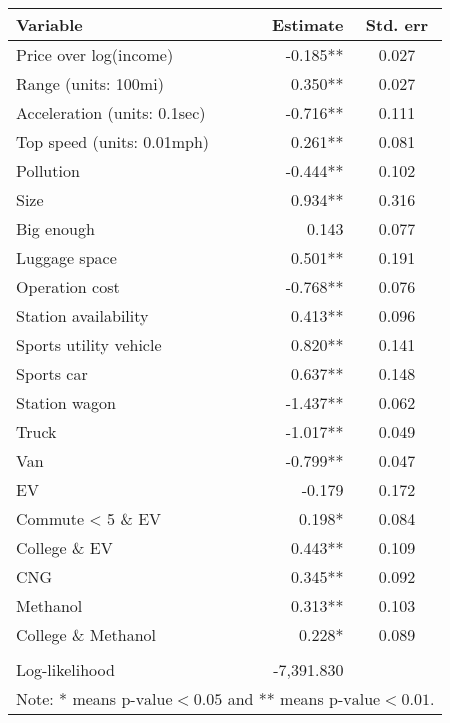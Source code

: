 \begin{tabular}{lrc}
\toprule
{Variable} &  Estimate &  Std. err \\
\midrule
Price over log(income)       &      -0.185** &    0.027 \\
Range (units: 100mi)         &       0.350** &    0.027 \\
Acceleration (units: 0.1sec) &      -0.716** &    0.111 \\
Top speed (units: 0.01mph)   &       0.261** &    0.081 \\
Pollution                    &      -0.444** &    0.102 \\
Size                         &       0.934** &    0.316 \\
Big enough                   &       0.143\hphantom{**} &    0.077 \\
Luggage space                &       0.501** &    0.191 \\
Operation cost               &      -0.768** &    0.076 \\
Station availability         &       0.413** &    0.096 \\
Sports utility vehicle       &       0.820** &    0.141 \\
Sports car                   &       0.637** &    0.148 \\
Station wagon                &      -1.437** &    0.062 \\
Truck                        &      -1.017** &    0.049 \\
Van                          &      -0.799** &    0.047 \\
EV                           &      -0.179\hphantom{**} &    0.172 \\
Commute < 5 \& EV             &       0.198*\hphantom{*} &    0.084 \\
College \& EV                 &       0.443** &    0.109 \\
CNG                          &       0.345** &    0.092 \\
Methanol                     &       0.313** &    0.103 \\
College \& Methanol           &       0.228*\hphantom{*} &    0.089 \\

\multicolumn{3}{c}{}\tabularnewline
Log-likelihood & -7,391.830\hphantom{**} & {} \tabularnewline

\bottomrule
\multicolumn{3}{l}{Note: * means $\textrm{p-value} < 0.05$ and ** means $\textrm{p-value} < 0.01$.} \\
\end{tabular}